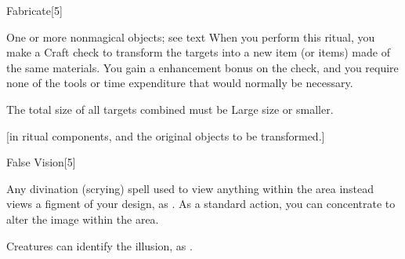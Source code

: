 \begin{spellsection}{Fabricate}[5]
    \begin{spellheader}
    \end{spellheader}
    \begin{spellcontent}
        \begin{spelltargetinginfo}
            \spellrng{\rngclose}
        \end{spelltargetinginfo}
        \begin{spelleffects}

            \begin{spelltargets}{One or more nonmagical objects; see text}
                \spelleffect When you perform this ritual, you make a Craft check to transform the targets into a new item (or items) made of the same materials. You gain a  enhancement bonus on the check, and you require none of the tools or time expenditure that would normally be necessary.

                The total size of all targets combined must be Large size or smaller. 
            \end{spelltargets}
        \end{spelleffects}
    \end{spellcontent}
    \begin{spellfooter}
        [in ritual components, and the original objects to be transformed.]
    \end{spellfooter}
\end{spellsection}

\begin{spellsection}{False Vision}[5]
    \begin{spellheader}
    \end{spellheader}
    \begin{spellcontent}
        \begin{spelltargetinginfo}
        \end{spelltargetinginfo}
        \begin{spelleffects}

            \spellline
            \spelleffect Any divination (scrying) spell used to view anything within the area instead views a figment of your design, as . As a standard action, you can concentrate to alter the image within the area.
            \spelldur \durext \dismissable
        \end{spelleffects}
    \end{spellcontent}
    \begin{spellfooter}
        \spellnotes Creatures can identify the illusion, as .
    \end{spellfooter}
\end{spellsection}

